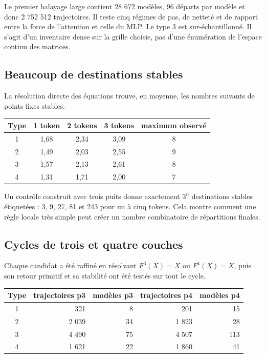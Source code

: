 \documentclass[11pt,a4paper]{article}
\theoremstyle{definition}
\begin{document}
Le premier balayage large contient 28 672 modèles, 96 départs par modèle et donc
2 752 512 trajectoires. Il teste cinq régimes de pas, de netteté et de rapport entre la
force de l'attention et celle du MLP. Le type 3 est sur-échantillonné. Il s'agit d'un
inventaire dense sur la grille choisie, pas d'une énumération de l'espace continu des
matrices.

\subsection{Beaucoup de destinations stables}

La résolution directe des équations trouve, en moyenne, les nombres suivants de
points fixes stables.

\begin{center}
\begin{tabular}{c@{\quad}ccc@{\qquad}c}
\toprule
Type & 1 token & 2 tokens & 3 tokens & maximum observé \\
\midrule
1 & 1,68 & 2,34 & 3,09 & 8 \\
2 & 1,49 & 2,03 & 2,55 & 9 \\
3 & 1,57 & 2,13 & 2,61 & 8 \\
4 & 1,31 & 1,71 & 2,00 & 7 \\
\bottomrule
\end{tabular}
\end{center}

Un contrôle construit avec trois puits donne exactement $3^n$ destinations stables
étiquetées : 3, 9, 27, 81 et 243 pour un à cinq tokens. Cela montre comment une règle
locale très simple peut créer un nombre combinatoire de répartitions finales.

\subsection{Cycles de trois et quatre couches}

Chaque candidat a été raffiné en résolvant $F^3(X)=X$ ou $F^4(X)=X$, puis son retour
primitif et sa stabilité ont été testés sur tout le cycle.

\begin{center}
\begin{tabular}{crrrr}
\toprule
Type & trajectoires p3 & modèles p3 & trajectoires p4 & modèles p4 \\
\midrule
1 & 321 & 8 & 201 & 15 \\
2 & 2 039 & 34 & 1 823 & 28 \\
3 & 4 490 & 75 & 4 507 & 113 \\
4 & 1 621 & 22 & 1 860 & 41 \\
\bottomrule
\end{tabular}
\end{center}
\end{document}
